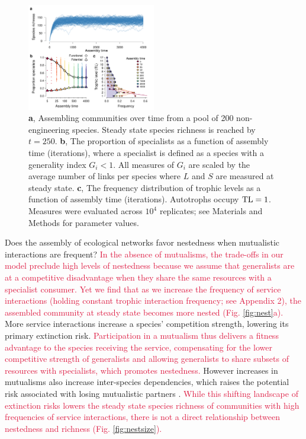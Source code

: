 \documentclass[twocolumn,preprintnumbers,amsmath,amssymb,superscriptaddress,linenumbers]{revtex4-1}
\newcommand{\rev}[1]{\textcolor{crimson}{#1}}
\begin{document}
\vspace{0mm}
\begin{figure}[h!]
\centering
\includegraphics[width=0.5\textwidth]{fig_trophic3.pdf}
\vspace{0mm}
\caption{
\textbf{a}, Assembling communities over time from a pool of 200 non-engineering species. 
Steady state species richness is reached by $t=250$.
\textbf{b}, The proportion of specialists as a function of assembly time (iterations), where a specialist is defined as a species with a generality index $G_i < 1$.
All measures of $G_i$ are scaled by the average number of links per species where $L$ and $S$ are measured at steady state.
\textbf{c}, The frequency distribution of trophic levels as a function of assembly time (iterations). 
Autotrophs occupy ${\rm TL}=1$.
Measures were evaluated across $10^4$ replicates; see Materials and Methods for parameter values.
\vspace{0mm}
}
\label{fig:trophic}
\end{figure}


Does the assembly of ecological networks favor nestedness when mutualistic interactions are frequent?
\rev{In the absence of mutualisms, the trade-offs in our model preclude high levels of nestedness because we assume that generalists are at a competitive disadvantage when they share the same resources with a specialist consumer.
Yet we find that as we increase the frequency of service interactions (holding constant trophic interaction frequency; see Appendix 2), the assembled community at steady state becomes more nested (Fig. \ref{fig:nest}a).
}
More service interactions increase a species' competition strength, lowering its primary extinction risk.
\rev{Participation in a mutualism thus delivers a fitness advantage to the species receiving the service, compensating for the lower competitive strength of generalists and allowing generalists to share subsets of resources with specialists, which promotes nestedness.}
However increases in mutualisms also increase inter-species dependencies, which raises the potential risk associated with losing mutualistic partners \cite{Bond1994,Colwell2012}. %
\rev{While this shifting landscape of extinction risks lowers the steady state species richness of communities with high frequencies of service interactions, there is not a direct relationship between nestedness and richness (Fig. \ref{fig:nestsize}).}
\end{document}
